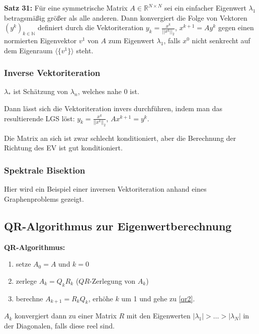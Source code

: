 \documentclass[a4paper]{article}
\newcommand{\set}[1]{\{ #1 \}}
\begin{document}
\textbf{Satz 31:} Für eine symmetrische Matrix $A \in \mathbb{R}^{N \times N}$
sei ein einfacher Eigenwert $\lambda_1$ betragsmäßig größer als alle anderen.
Dann konvergiert die Folge von Vektoren $(y^k)_{k \in \mathbb{N}}$ definiert
durch die Vektoriteration $y_k = \frac{x^k}{||x^k||_2}$, $x^{k + 1} = A y^k$
gegen einen normierten Eigenvektor $v^1$ von $A$ zum Eigenwert $\lambda_1$,
falls $x^0$ nicht senkrecht auf dem Eigenraum $\langle\set{v^1}\rangle$ steht.

\subsubsection{Inverse Vektoriteration}

$\lambda_*$ ist Schätzung von $\lambda_n$, welches nahe 0 ist.

Dann lässt sich die Vektoriteration invers durchführen, indem man das
resultierende LGS löst: $y_k = \frac{x^k}{||x^k||_2}$, $A x^{k + 1} = y^k$.

Die Matrix an sich ist zwar schlecht konditioniert, aber die Berechnung der
Richtung des EV ist gut konditioniert.

\subsubsection{Spektrale Bisektion}

Hier wird ein Beispiel einer inversen Vektoriteration anhand eines
Graphenproblems gezeigt.

\subsection{QR-Algorithmus zur Eigenwertberechnung}

\textbf{QR-Algorithmus:}
\begin{enumerate}
    \item setze $A_0 = A$ und $k = 0$
    \item\label{qr2} zerlege $A_k = Q_k R_k$ ($QR$-Zerlegung von $A_k$)
    \item berechne $A_{k + 1} = R_k Q_k$, erhöhe $k$ um 1 und gehe zu \ref{qr2}.
\end{enumerate}

$A_k$ konvergiert dann zu einer Matrix $R$ mit den Eigenwerten $|\lambda_1| >
\dots > |\lambda_N|$ in der Diagonalen, falls diese reel sind.
\end{document}
